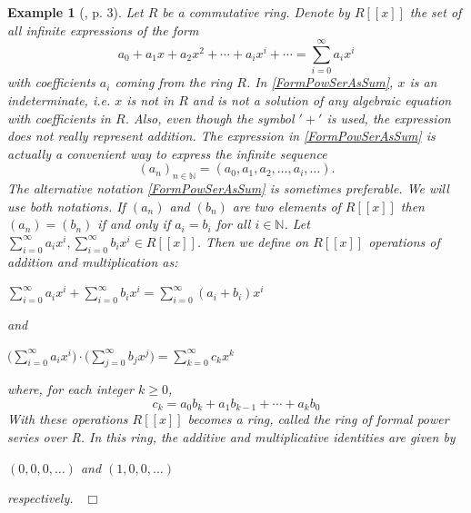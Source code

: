 \documentclass[12pt, oneside]{book}
\newtheorem{example}[theorem]{Example}
\newcommand{\qed}{\hfill ~$\Box$\\}
\begin{document}
\begin{example}[\cite{S}, p. 3] \label{exmFormalPowerSer}
\normalfont
Let $R$ be a commutative ring. Denote by $R[[x]]$ the set of all infinite expressions of the form 
\begin{equation} \label{FormPowSerAsSum}
a_0+a_1x+a_2x^2+ \cdots + a_i x^i + \cdots = \displaystyle \sum_{i = 0}^{\infty} a_ix^i
\end{equation}
with coefficients $a_i$ coming from the ring $R$. In
 \eqref{FormPowSerAsSum}, $x$ is an indeterminate, i.e. $x$ is not in $R$ and is not a solution 
 of any algebraic equation with coefficients in $R$. Also, even though the 
 symbol $'+'$ is used, the expression does not really represent addition. 
The expression in \eqref{FormPowSerAsSum} is actually a convenient way to express the infinite sequence 
\begin{equation} \label{FormPowSerAsSeq}
(a_n)_{n \in \mathbb{N}}=(a_0, a_1, a_2, \dots, a_i, \dots).
\end{equation}
\noindent The alternative notation \eqref{FormPowSerAsSum} is sometimes preferable. We will use both notations. 
\vskip 0.3cm
\noindent If $(a_n)$ and $(b_n)$ are two elements of $R[[x]]$ then $(a_n) = (b_n)$ if and only if 
$a_i = b_i$ for all $i \in \mathbb{N}$.
\vskip 0.3cm
\noindent Let $\displaystyle \sum_{i = 0}^{\infty} a_ix^i, \displaystyle \sum_{i = 0}^{\infty} b_ix^i 
\in R[[x]]$. Then we define on $R[[x]]$ operations of addition and multiplication as: 
\begin{center}
$\displaystyle \sum_{i = 0}^{\infty} a_ix^i + \displaystyle \sum_{i = 0}^{\infty} b_ix^i
= \displaystyle \sum_{i = 0}^{\infty} (a_i + b_i) x^i$
\end{center}
and
\begin{center}
$\big(\displaystyle \sum_{i = 0}^{\infty} a_ix^i\big) \cdot 
\big( \displaystyle \sum_{j = 0}^{\infty} b_jx^j \big) = \displaystyle \sum_{k = 0}^{\infty} c_k x^k$
\end{center}
where, for each integer $k \geqslant 0$, 
\begin{equation} \label{Theck}
c_k = a_0b_k + a_1b_{k-1} + \cdots + a_kb_0
\end{equation}
With these operations $R[[x]]$ becomes a ring, called the {\sl ring of formal power series over R}.
In this ring, the additive and multiplicative identities are given by
\begin{center} 
$(0,0,0, \dots)$ and $(1,0,0,\dots)$ 
\end{center}
respectively. 
\qed
\end{example}
\end{document}
